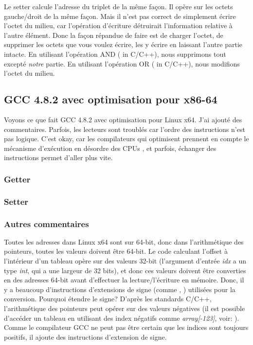 Le setter calcule l'adresse du triplet de la même façon.
Il opère sur les octets gauche/droit de la même façon.
Mais il n'est pas correct de simplement écrire l'octet du milieu, car l'opération
d'écriture détruirait l'information relative à l'autre élément.
Donc la façon répandue de faire est de charger l'octet, de supprimer les octets que
vous voulez écrire, les y écrire en laissant l'autre partie intacte.
En utilisant l'opération AND (\TT{\&} in C/C++), nous supprimons tout excepté \emph{notre} partie.
En utilisant l'opération OR (\TT{|} in C/C++), nous modifions l'octet du milieu.

\subsection{GCC 4.8.2 avec optimisation pour x86-64}

Voyons ce que fait GCC 4.8.2 avec optimisation pour Linux x64.
J'ai ajouté des commentaires.
Parfois, les lecteurs sont troublés car l'ordre des instructions n'est pas logique.
C'est okay, car les compilateurs qui optimisent prennent en compte le mécanisme d'exécution
en désordre des CPUs , et parfois,  échanger des instructions permet d'aller plus vite.

\subsubsection{Getter}



\subsubsection{Setter}



\subsubsection{Autres commentaires}

Toutes les adresses dans Linux x64 sont sur 64-bit, donc dans l'arithmétique des
pointeurs, toutes les valeurs doivent être 64-bit.
Le code calculant l'offset à l'intérieur d'un  tableau opère sur des valeurs 32-bit
(l'argument d'entrée \emph{idx} a un type \emph{int}, qui a une largeur de 32 bits),
et donc ces valeurs doivent être converties en des adresses 64-bit avant d'effectuer
la lecture/l'écriture en mémoire.
Donc, il y a beaucoup d'instructions d'extensions de signe (comme , )
utilisées pour la conversion.
Pourquoi étendre le signe? D'après les standards C/C++, l'arithmétique des pointeurs
peut opérer sur des valeurs négatives (il est possible d'accéder un tableau en utilisant
des index négatifs comme \emph{array[-123]}, voir: ).
Comme le compilateur GCC ne peut pas être certain que les indices sont toujours positifs,
il ajoute des instructions d'extension de signe.


